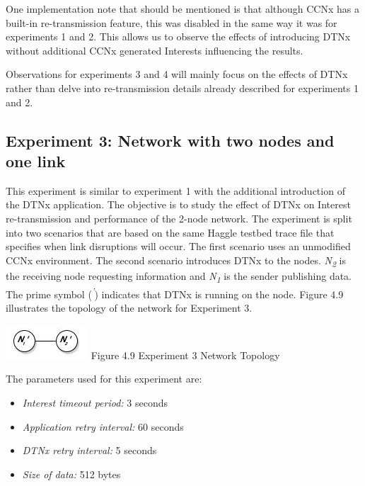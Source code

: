 \documentclass[a4paper,12pt]{report}      %
\begin{document}
One implementation note that should be mentioned is that although CCNx has a built-in re-transmission feature, this was disabled in the same way it was for experiments 1 and 2. This allows us to observe the effects of introducing DTNx without additional CCNx generated Interests influencing the results.

Observations for experiments 3 and 4 will mainly focus on the effects of DTNx rather than delve into
re-transmission details already described for experiments 1 and 2.

\subsection{Experiment 3: Network with two nodes and one link}

This experiment is similar to experiment 1 with the additional introduction of the DTNx application. The objective is to study the effect of DTNx on Interest re-transmission and performance of the 2-node network. The experiment is split into two scenarios that are based on the same Haggle testbed trace file that specifies when link disruptions will occur. The first scenario uses an unmodified CCNx environment. The second scenario introduces DTNx to the nodes. \emph{N\textsubscript{2}} is the receiving node requesting information and \emph{N\textsubscript{1}} is the sender publishing data. The prime symbol (\emph{\textsuperscript{'}}) indicates that DTNx is running on the node. Figure 4.9 illustrates the topology of the network for Experiment 3.

\begin{center}
\includegraphics[scale=0.75]{exp3topo.jpg}\newline
Figure 4.9 Experiment 3 Network Topology 
\end{center}

\noindent The parameters used for this experiment are:
\begin{itemize}
\item \textsl{Interest timeout period:} 3 seconds
\item \textsl{Application retry interval:} 60 seconds
\item \textsl{DTNx retry interval:} 5 seconds
\item \textsl{Size of data:} 512 bytes
\end{itemize}
\end{document}
